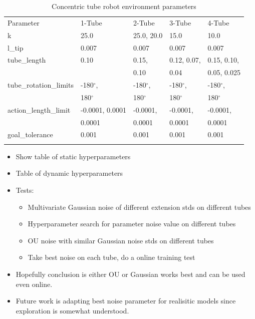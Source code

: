 \begin{table}
\caption{Concentric tube robot environment parameters}
\label{tab:2}       %
\begin{tabular}{lllll}
\hline\noalign{\smallskip}
Parameter & 1-Tube & 2-Tube & 3-Tube & 4-Tube\\
\noalign{\smallskip}\hline\noalign{\smallskip}
k & 25.0 & 25.0, 20.0 & 15.0 & 10.0\\
l\_tip  & 0.007 & 0.007 & 0.007 & 0.007\\
tube\_length & 0.10 & 0.15, & 0.12, 0.07, & 0.15, 0.10, \\
& & 0.10 & 0.04 & 0.05, 0.025 \\
tube\_rotation\_limits  & -180$^\circ$,  & -180$^\circ$, & -180$^\circ$, & -180$^\circ$,\\
& 180$^\circ$ & 180$^\circ$ & 180$^\circ$ & 180$^\circ$\\
action\_length\_limit & -0.0001, 0.0001 & -0.0001, & -0.0001, & -0.0001, \\
& 0.0001 & 0.0001 & 0.0001 & 0.0001 \\
goal\_tolerance & 0.001 & 0.001 & 0.001 & 0.001\\

\noalign{\smallskip}\hline
\end{tabular}
\end{table}


\begin{itemize}
    \item Show table of static hyperparameters
    \item Table of dynamic hyperparameters
    \item Tests:
    \begin{itemize}
        \item Multivariate Gaussian noise of different extension stds on different tubes
        \item Hyperparameter search for parameter noise value on different tubes
        \item OU noise with similar Gaussian noise stds on different tubes
        \item Take best noise on each tube, do a online training test
    \end{itemize}
    \item Hopefully conclusion is either OU or Gaussian works best and can be used even online.
    \item Future work is adapting best noise parameter for realisitic models since exploration is somewhat understood.

\end{itemize}

